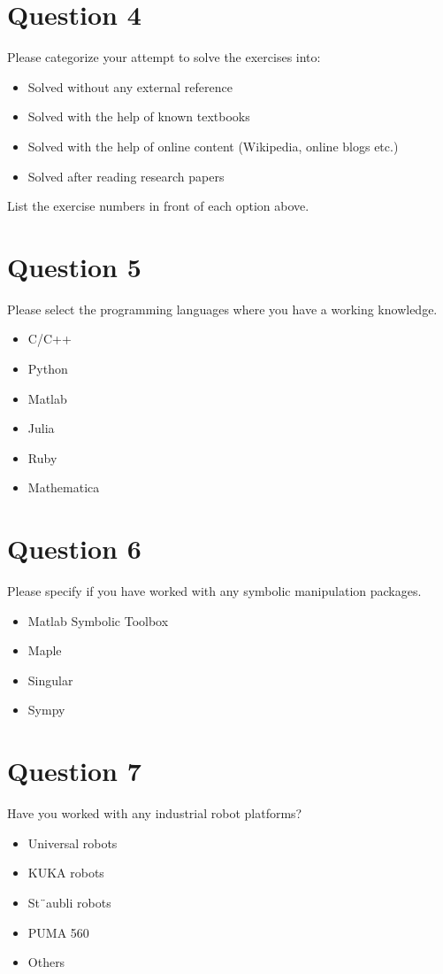 \section{Question 4}
Please categorize your attempt to solve the exercises into:
\begin{itemize}
\item Solved without any external reference
\item Solved with the help of known textbooks
\item Solved with the help of online content (Wikipedia, online blogs etc.)
\item Solved after reading research papers
\end{itemize}
List the exercise numbers in front of each option above.

\section{Question 5}
Please select the programming languages where you have a working knowledge.
\begin{itemize}
\item C/C++
\item Python
\item Matlab
\item Julia
\item Ruby
\item Mathematica
\end{itemize}

\section{Question 6}
Please specify if you have worked with any symbolic manipulation packages.
\begin{itemize}
\item Matlab Symbolic Toolbox
\item Maple
\item Singular
\item Sympy
\end{itemize}

\section{Question 7}
Have you worked with any industrial robot platforms?
\begin{itemize}
\item Universal robots
\item KUKA robots
\item St¨aubli robots
\item PUMA 560
\item Others
\end{itemize}

